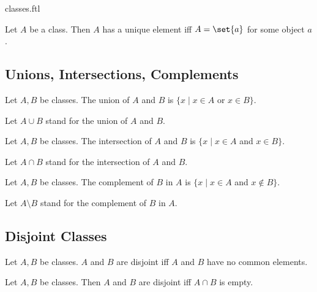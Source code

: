 \documentclass{naproche-library}
\begin{document}
\begin{smodule}{classes.ftl}
  \begin{proposition}[forthel,id=FOUNDATIONS_01_0166348647163481,printid]
    Let $A$ be a class.
    Then $A$ has a unique element iff $A = \set{a}$ for some object $a$.
  \end{proposition}


  \subsection*{Unions, Intersections, Complements}

  \begin{definition}[forthel,id=FOUNDATIONS_01_2159753924968448,printid]
    Let $A, B$ be classes.
    The union of $A$ and $B$ is $\{ x \mid x \in A$ or $x \in B \}$.

    Let $A \cup B$ stand for the union of $A$ and $B$.
  \end{definition}

  \begin{definition}[forthel,id=FOUNDATIONS_01_5744033011859456,printid]
    Let $A, B$ be classes.
    The intersection of $A$ and $B$ is $\{ x \mid x \in A$ and $x \in B \}$.

    Let $A \cap B$ stand for the intersection of $A$ and $B$.
  \end{definition}

  \begin{definition}[forthel,id=FOUNDATIONS_01_7620345041256448,printid]
    Let $A, B$ be classes.
    The complement of $B$ in $A$ is $\{ x \mid x \in A$ and $x \notin B \}$.

    Let $A \setminus B$ stand for the complement of $B$ in $A$.
  \end{definition}


  \subsection*{Disjoint Classes}

  \begin{definition}[forthel,id=FOUNDATIONS_01_4981913324355584,printid]
    Let $A, B$ be classes.
    $A$ and $B$ are disjoint iff $A$ and $B$ have no common elements.
  \end{definition}

  \begin{proposition}[forthel,id=FOUNDATIONS_01_1211191546347520,printid]
    Let $A, B$ be classes.
    Then $A$ and $B$ are disjoint iff $A \cap B$ is empty.
  \end{proposition}
\end{smodule}
\end{document}

